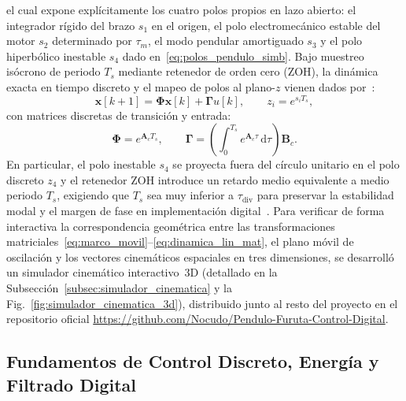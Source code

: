 el cual expone explícitamente los cuatro polos propios en lazo abierto: el integrador rígido del brazo $s_1$ en el origen, el polo electromecánico estable del motor $s_2$ determinado por $\tau_m$, el modo pendular amortiguado $s_3$ y el polo hiperbólico inestable $s_4$ dado en~\eqref{eq:polos_pendulo_simb}. Bajo muestreo isócrono de periodo $T_s$ mediante retenedor de orden cero (ZOH), la dinámica exacta en tiempo discreto y el mapeo de polos al plano-$z$ vienen dados por~\cite{Astrom1997,Franklin2015,OgataDiscrete1995}:
\begin{equation}
    \mathbf{x}[k+1] = \mathbf{\Phi}\mathbf{x}[k] + \mathbf{\Gamma}u[k], \qquad
    z_i = e^{s_i T_s},
    \label{eq:ss_discreto}
\end{equation}
con matrices discretas de transición y entrada:
\begin{equation}
    \mathbf{\Phi} = e^{\mathbf{A}_c T_s}, \qquad
    \mathbf{\Gamma} = \left(\int_0^{T_s} e^{\mathbf{A}_c\tau}\,\mathrm{d}\tau\right)\mathbf{B}_c.
    \label{eq:zoh_teorico}
\end{equation}
En particular, el polo inestable $s_4$ se proyecta fuera del círculo unitario en el polo discreto $z_4$ y el retenedor ZOH introduce un retardo medio equivalente a medio periodo $T_s$, exigiendo que $T_s$ sea muy inferior a $\tau_{\text{div}}$ para preservar la estabilidad modal y el margen de fase en implementación digital~\cite{Astrom1997,Franklin2015}. Para verificar de forma interactiva la correspondencia geométrica entre las transformaciones matriciales~\eqref{eq:marco_movil}--\eqref{eq:dinamica_lin_mat}, el plano móvil de oscilación y los vectores cinemáticos espaciales en tres dimensiones, se desarrolló un simulador cinemático interactivo~3D (detallado en la Subsección~\ref{subsec:simulador_cinematica} y la Fig.~\ref{fig:simulador_cinematica_3d}), distribuido junto al resto del proyecto en el repositorio oficial \url{https://github.com/Nocudo/Pendulo-Furuta-Control-Digital}.

\subsection{Fundamentos de Control Discreto, Energía y Filtrado Digital}\label{subsec:control_filtrado}

